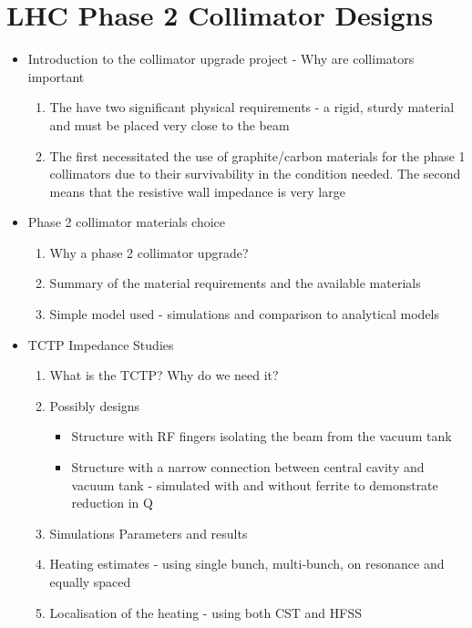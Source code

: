%
%
%
%



\section{LHC Phase 2 Collimator Designs}
\begin{itemize}
\item{Introduction to the collimator upgrade project - Why are collimators important}
\begin{enumerate}
\item{The have two significant physical requirements - a rigid, sturdy material and must be placed very close to the beam}
\item{The first necessitated the use of graphite/carbon materials for the phase 1 collimators due to their survivability in the condition needed. The second means that the resistive wall impedance is very large}
\end{enumerate}
\item{Phase 2 collimator materials choice}
\begin{enumerate}
\item{Why a phase 2 collimator upgrade?}
\item{Summary of the material requirements and the available materials}
\item{Simple model used - simulations and comparison to analytical models}
\end{enumerate}
\item{TCTP Impedance Studies}
\begin{enumerate}
\item{What is the TCTP? Why do we need it?}
\item{Possibly designs}
\begin{itemize}
\item{Structure with RF fingers isolating the beam from the vacuum tank}
\item{Structure with a narrow connection between central cavity and vacuum tank - simulated with and without ferrite to demonstrate reduction in Q}
\end{itemize}
\item{Simulations Parameters and results}
\item{Heating estimates - using single bunch, multi-bunch, on resonance and equally spaced}
\item{Localisation of the heating - using both CST and HFSS}

\end{enumerate}
\end{itemize}
